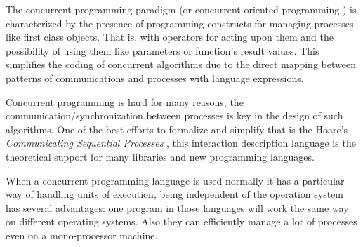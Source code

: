 
The concurrent programming paradigm (or concurrent oriented programming \cite{Armstrong2003}) is characterized by the presence of programming constructs for managing processes like first class objects. That is, with operators for acting upon them and the possibility of using them like parameters or function's result values. This simplifies the coding of concurrent algorithms due to the direct mapping between patterns of communications and processes with language expressions.

Concurrent programming is hard for many reasons, the communication/synchronization between processes is key in the design of such algorithms. One of the best efforts to formalize and simplify that is the Hoare’s {\em Communicating Sequential Processes} \cite{Hoare:1978:CSP:359576.359585}, this interaction description language is the theoretical support for many libraries and new programming languages.

When a concurrent programming language is used normally it has a particular way of handling units of execution, being independent of the operation system has several advantages: one program in those languages will work the same way on different operating systems. Also they can efficiently manage a lot of processes even on a mono-processor machine.
